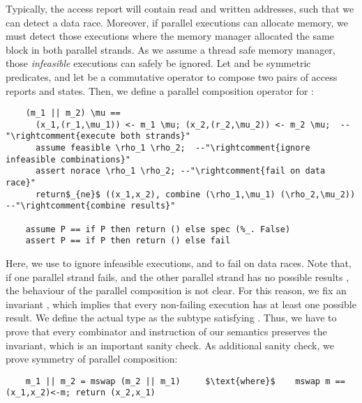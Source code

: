 \documentclass[a4paper,UKenglish,cleveref, autoref, thm-restate]{lipics-v2021}
\begin{document}
  Typically, the access report will contain read and written addresses, such that we can detect a data race.
  Moreover, if parallel executions can allocate memory, we must detect those
  executions where the memory manager allocated the same block in both parallel strands.
  As we assume a thread safe memory manager, those \emph{infeasible} executions can safely be ignored.
  Let  and  be symmetric predicates,
  and let  be a commutative operator to
  compose two pairs of access reports and states. Then, we define a parallel composition operator for :
  \begin{lstlisting}
    (m_1 || m_2) \mu ==
      (x_1,(r_1,\mu_1)) <- m_1 \mu; (x_2,(r_2,\mu_2)) <- m_2 \mu;  --"\rightcomment{execute both strands}"
      assume feasible \rho_1 \rho_2;  --"\rightcomment{ignore infeasible combinations}"
      assert norace \rho_1 \rho_2; --"\rightcomment{fail on data race}"
      return$_{ne}$ ((x_1,x_2), combine (\rho_1,\mu_1) (\rho_2,\mu_2))  --"\rightcomment{combine results}"

    assume P == if P then return () else spec (%_. False)
    assert P == if P then return () else fail
  \end{lstlisting}
  Here, we use  to ignore infeasible executions, and  to fail on data races.
  Note that, if one parallel strand fails, and the other parallel strand has no possible
  results , the behaviour of the parallel composition is not clear.
  For this reason, we fix an invariant ,
  which implies that every non-failing execution has at least one possible result.
  We define the actual type  as the subtype satisfying .
  Thus, we have to prove that every combinator and instruction of our semantics
  preserves the invariant, which is an important sanity check.
  As additional sanity check, we prove symmetry of parallel composition:
  \begin{lstlisting}
    m_1 || m_2 = mswap (m_2 || m_1)     $\text{where}$    mswap m == (x_1,x_2)<-m; return (x_2,x_1)
  \end{lstlisting}
\end{document}
